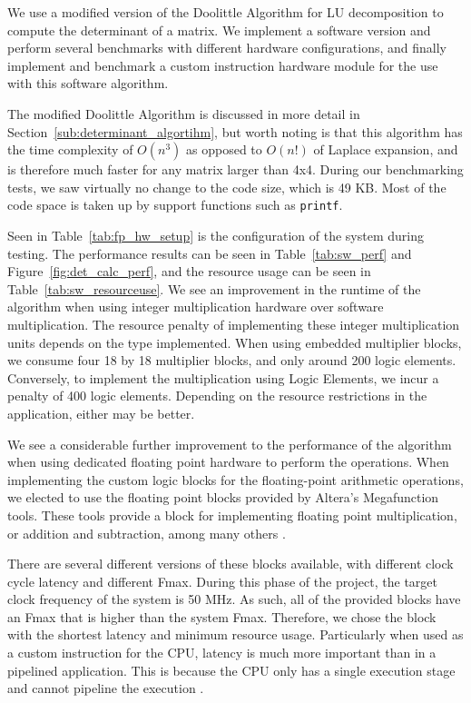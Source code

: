 \documentclass[]{article}
\begin{document}
We use a modified version of the Doolittle Algorithm for LU decomposition to compute the determinant of a matrix.
We implement a software version and perform several benchmarks with different hardware configurations, and finally implement and benchmark a custom instruction hardware module for the use with this software algorithm.

The modified Doolittle Algorithm is discussed in more detail in Section~\ref{sub:determinant_algortihm}, but worth noting is that this algorithm has the time complexity of $O(n^3)$ as opposed to $O(n!)$ of Laplace expansion, and is therefore much faster for any matrix larger than 4x4.
During our benchmarking tests, we saw virtually no change to the code size, which is 49 KB.
Most of the code space is taken up by support functions such as \verb"printf".

Seen in Table~\ref{tab:fp_hw_setup} is the configuration of the system during testing. The performance results can be seen in Table~\ref{tab:sw_perf} and Figure~\ref{fig:det_calc_perf}, and the resource usage can be seen in Table~\ref{tab:sw_resourceuse}.
We see an improvement in the runtime of the algorithm when using integer multiplication hardware over software multiplication.
The resource penalty of implementing these integer multiplication units depends on the type implemented. When using embedded multiplier blocks, we consume four 18 by 18 multiplier blocks, and only around 200 logic elements.
Conversely, to implement the multiplication using Logic Elements, we incur a penalty of 400 logic elements.
Depending on the resource restrictions in the application, either may be better.

We see a considerable further improvement to the performance of the algorithm when using dedicated floating point hardware to perform the operations.
When implementing the custom logic blocks for the floating-point arithmetic operations, we elected to use the floating point blocks provided by Altera's Megafunction tools.
These tools provide a block for implementing floating point multiplication, or addition and subtraction, among many others \cite{megafunc}.

There are several different versions of these blocks available, with different clock cycle latency and different Fmax. During this phase of the project, the target clock frequency of the system is 50 MHz.
As such, all of the provided blocks have an Fmax that is higher than the system Fmax. Therefore, we chose the block with the shortest latency and minimum resource usage.
Particularly when used as a custom instruction for the CPU, latency is much more important than in a pipelined application. This is because the CPU only has a single execution stage and cannot pipeline the execution \cite{Nios}.
\end{document}

